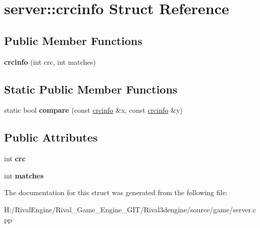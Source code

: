 \hypertarget{structserver_1_1crcinfo}{}\section{server\+:\+:crcinfo Struct Reference}
\label{structserver_1_1crcinfo}
\subsection*{Public Member Functions}
\begin{DoxyCompactItemize}
\item 
\mbox{\label{structserver_1_1crcinfo_acfc8df852fbd83f97b29d40ac0c4748c}} 
{\bfseries crcinfo} (int crc, int matches)
\end{DoxyCompactItemize}
\subsection*{Static Public Member Functions}
\begin{DoxyCompactItemize}
\item 
\mbox{\label{structserver_1_1crcinfo_ad09fe4a3fae8e872f603636b831d4dca}} 
static bool {\bfseries compare} (const \hyperlink{structserver_1_1crcinfo}{crcinfo} \&x, const \hyperlink{structserver_1_1crcinfo}{crcinfo} \&y)
\end{DoxyCompactItemize}
\subsection*{Public Attributes}
\begin{DoxyCompactItemize}
\item 
\mbox{\label{structserver_1_1crcinfo_ae0722e68e926d77d761430071c2ce1f8}} 
int {\bfseries crc}
\item 
\mbox{\label{structserver_1_1crcinfo_afc558b8cc6c75c71a30498fd3bf92b45}} 
int {\bfseries matches}
\end{DoxyCompactItemize}


The documentation for this struct was generated from the following file\+:\begin{DoxyCompactItemize}
\item 
H\+:/\+Rival\+Engine/\+Rival\+\_\+\+Game\+\_\+\+Engine\+\_\+\+G\+I\+T/\+Rival3dengine/source/game/server.\+cpp\end{DoxyCompactItemize}
